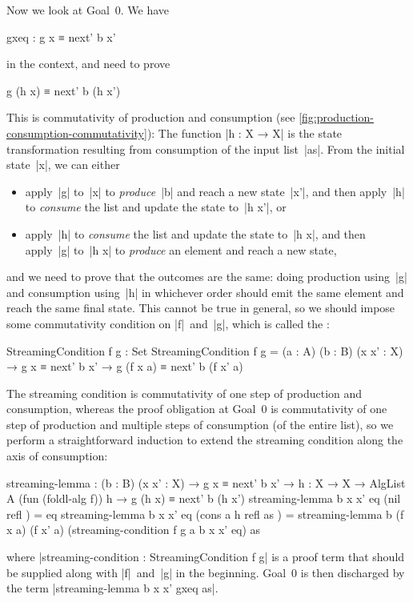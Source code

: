 Now we look at Goal~0.
We have
\begin{code}
gxeq : g x ≡ next' b x'
\end{code}
in the context, and need to prove
\begin{code}
g (h x) ≡ next' b (h x')
\end{code}
This is commutativity of production and consumption (see \autoref{fig:production-consumption-commutativity}):
The function |h : X → X| is the state transformation resulting from consumption of the input list~|as|.
From the initial state~|x|, we can either
\begin{itemize}
\item apply~|g| to~|x| to \emph{produce}~|b| and reach a new state~|x'|, and then apply~|h| to \emph{consume} the list and update the state to~|h x'|, or
\item apply~|h| to \emph{consume} the list and update the state to~|h x|, and then apply~|g| to~|h x| to \emph{produce} an element and reach a new state,
\end{itemize}
and we need to prove that the outcomes are the same: doing production using~|g| and consumption using~|h| in whichever order should emit the same element and reach the same final state.
This cannot be true in general, so we should impose some commutativity condition on |f|~and~|g|, which is called the :
\begin{code}
StreamingCondition f g : Set
StreamingCondition f g =
  (a : A) (b : B) (x x' : X) → g x ≡ next' b x' → g (f x a) ≡ next' b (f x' a)
\end{code}
The streaming condition is commutativity of one step of production and consumption, whereas the proof obligation at Goal~0 is commutativity of one step of production and multiple steps of consumption (of the entire list), so we perform a straightforward induction to extend the streaming condition along the axis of consumption:
\begin{code}
streaming-lemma :
  (b : B) (x x' : X) → g x ≡ next' b x' →
  {h : X → X} → AlgList A (fun (foldl-alg f)) h → g (h x) ≡ next' b (h x')
streaming-lemma b x x' eq (nil       refl     ) = eq
streaming-lemma b x x' eq (cons a h  refl as  ) =
  streaming-lemma b (f x a) (f x' a) (streaming-condition f g a b x x' eq) as
\end{code}
where |streaming-condition : StreamingCondition f g| is a proof term that should be supplied along with |f|~and~|g| in the beginning.
Goal~0 is then discharged by the term |streaming-lemma b x x' gxeq as|.


